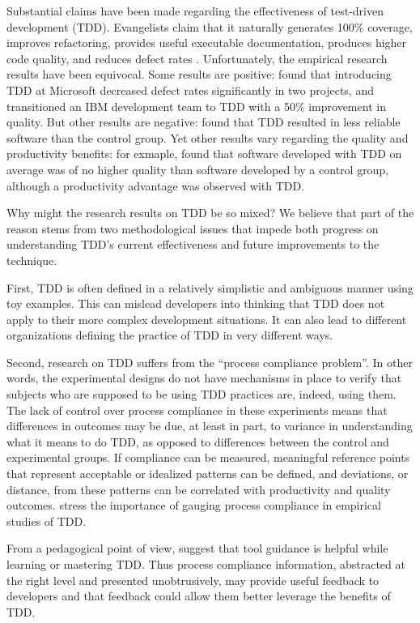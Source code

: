 \documentclass[smallextended]{svjour3}     %
\begin{document}
Substantial claims have been made regarding the effectiveness of
test-driven development (TDD). Evangelists claim that it naturally
generates 100\% coverage, improves refactoring, provides useful executable
documentation, produces higher code quality, and reduces defect rates
\citep{Beck:03}.  Unfortunately, the empirical research results have been
equivocal.  Some results are positive: \cite{Bhat:06} found that
introducing TDD at Microsoft decreased defect rates significantly in two
projects, and \cite{Maximilien:03} transitioned an IBM development team to
TDD with a 50\% improvement in quality. But other results are negative:
\cite{Muller:02} found that TDD resulted in less reliable software than the
control group. Yet other results vary regarding the quality and productivity benefits: 
for exmaple, \cite{Erdogmus:05} found that software developed with TDD
on average was of no
higher quality than software developed by a control group,
 although a productivity advantage 
was observed with TDD.

Why might the research results on TDD be so mixed?  We believe that part of
the reason stems from two methodological issues that impede both progress
on understanding TDD's current effectiveness and future improvements to the
technique. 

First, TDD is often defined in a relatively simplistic and ambiguous manner
using toy examples.  This can mislead developers into thinking that TDD
does not apply to their more complex development situations. It can also
lead to different organizations defining the practice of TDD in very
different ways.

Second, research on TDD suffers from the ``process compliance problem''.
In other words, the experimental designs do not have mechanisms in place to
verify that subjects who are supposed to be using TDD practices are,
indeed, using them.  The lack of control over process compliance in these
experiments means that differences in outcomes may be due, at least in
part, to variance in understanding what it means to do TDD, as opposed to
differences between the control and experimental groups. If compliance can be
 measured,
meaningful reference points that represent acceptable or idealized patterns
can be defined, and deviations, or distance,  from these patterns can be correlated
with productivity and quality outcomes. \cite{Erdogmus:05} stress the importance of gauging process
compliance in empirical studies of TDD. 

From a pedagogical point of view,  \cite{Mishali:08}  suggest 
that tool guidance is helpful while learning or mastering TDD. 
Thus process compliance information, abstracted at the right level and 
presented unobtrusively, 
may provide useful feedback to developers and that feedback could
 allow them better leverage the benefits of TDD. 
\end{document}
